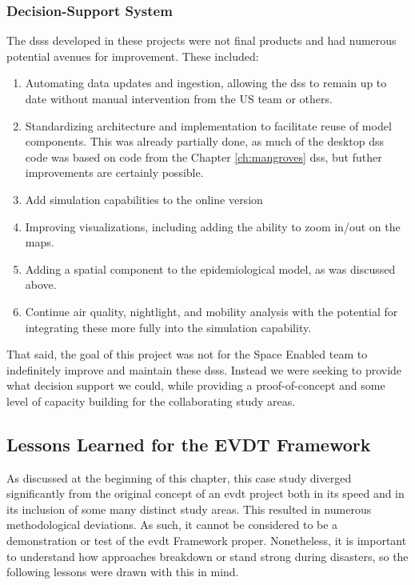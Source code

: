 \subsubsection{Decision-Support System}

The \acp{dss} developed in these projects were not final products and had numerous potential avenues for improvement. These included:

\begin{enumerate}[itemsep=0pt,parsep=0pt]
    \item Automating data updates and ingestion, allowing the \ac{dss} to remain up to date without manual intervention from the US team or others. 
    \item Standardizing architecture and implementation to facilitate reuse of model components. This was already partially done, as much of the desktop \ac{dss} code was based on code from the Chapter \ref{ch:mangroves} \ac{dss}, but futher improvements are certainly possible.
    \item Add simulation capabilities to the online version
    \item Improving visualizations, including adding the ability to zoom in/out on the maps.
    \item Adding a spatial component to the epidemiological model, as was discussed above.
    \item Continue air quality, nightlight, and mobility analysis with the potential for integrating these more fully into the simulation capability. 
\end{enumerate}

That said, the goal of this project was not for the Space Enabled team to indefinitely improve and maintain these \acp{dss}. Instead we were seeking to provide what decision support we could, while providing a proof-of-concept and some level of capacity building for the collaborating study areas. 

\subsection{Lessons Learned for the EVDT Framework} \label{sec:vida-lessons}

As discussed at the beginning of this chapter, this case study diverged significantly from the original concept of an \ac{evdt} project both in its speed and in its inclusion of some many distinct study areas. This resulted in numerous methodological deviations. As such, it cannot be considered to be a demonstration or test of the \ac{evdt} Framework proper. Nonetheless, it is important to understand how approaches breakdown or stand strong during disasters, so the following lessons were drawn with this in mind.

